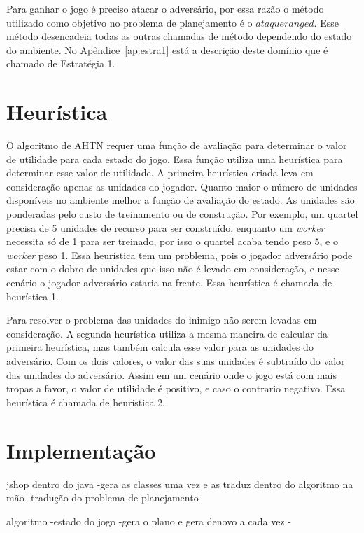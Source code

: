 Para ganhar o jogo é preciso atacar o adversário, por essa razão o método utilizado como objetivo no problema de planejamento é o $ataqueranged$.
Esse método desencadeia todas as outras chamadas de método dependendo do estado do ambiente.
No Apêndice~\ref{ap:estra1} está a descrição deste domínio que é chamado de Estratégia 1.

\section{Heurística}

O algoritmo de AHTN requer uma função de avaliação para determinar o valor de utilidade para cada estado do jogo.
Essa função utiliza uma heurística para determinar esse valor de utilidade.
A primeira heurística criada leva em consideração apenas as unidades do jogador.
Quanto maior o número de unidades disponíveis no ambiente melhor a função de avaliação do estado.
As unidades são ponderadas pelo custo de treinamento ou de construção.
Por exemplo, um quartel precisa de 5 unidades de recurso para ser construído, enquanto um \textit{worker} necessita só de 1 para ser treinado, por isso o quartel acaba tendo peso 5, e o \textit{worker} peso 1. 
Essa heurística tem um problema, pois o jogador adversário pode estar com o dobro de unidades que isso não é levado em consideração, e nesse cenário o jogador adversário estaria na frente. 
Essa heurística é chamada de heurística 1.

Para resolver o problema das unidades do inimigo não serem levadas em consideração.
A segunda heurística utiliza a mesma maneira de calcular da primeira heurística, mas também calcula esse valor para as unidades do adversário. 
Com os dois valores, o valor das suas unidades é subtraído do valor das unidades do adversário. 
Assim em um cenário onde o jogo está com mais tropas a favor, o valor de utilidade é positivo, e caso o contrario negativo.
Essa heurística é chamada de heurística 2.

\section{Implementação}


jshop dentro do java
-gera as classes uma vez e as traduz dentro do algoritmo na mão
-tradução do problema de planejamento


algoritmo
	-estado do jogo
	-gera o plano e gera denovo a cada vez
	-

	
